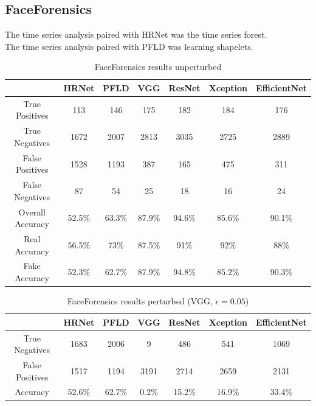 \subsection{FaceForensics}

The time series analysis paired with HRNet was the time series forest.\\
The time series analysis paired with PFLD was learning shapelets.

\begin{table}[H]
    \centering
    \begin{tabular}{|c|c|c|c|c|c|c|}
        \hline
        \textbf{} & \textbf{HRNet} & \textbf{PFLD} &  \textbf{VGG} & \textbf{ResNet} & \textbf{Xception} & \textbf{EfficientNet} \\
        \hline
        True Positives & 113 & 146 & 175 & 182 & 184 & 176\\
        \hline
        True Negatives & 1672 & 2007 & 2813 & 3035 & 2725 & 2889\\
        \hline
        False Positives & 1528 & 1193 & 387 & 165 & 475 & 311\\
        \hline
        False Negatives & 87 & 54 & 25 & 18 & 16 & 24\\
        \hline
        Overall Accuracy & 52.5\% & 63.3\% & 87.9\% & 94.6\% & 85.6\% & 90.1\% \\
        \hline
        Real Accuracy & 56.5\% & 73\% & 87.5\% & 91\% & 92\% & 88\% \\
        \hline
        Fake Accuracy & 52.3\% & 62.7\% & 87.9\% & 94.8\% & 85.2\% & 90.3\% \\
        \hline
    \end{tabular}
    \caption{FaceForensics results unperturbed}
    \label{tab:ff-un}
\end{table}

\begin{table}[H]
    \centering
    \begin{tabular}{|c|c|c|c|c|c|c|}
        \hline
        \textbf{} & \textbf{HRNet} & \textbf{PFLD} &  \textbf{VGG} & \textbf{ResNet} & \textbf{Xception} & \textbf{EfficientNet} \\
        \hline
        True Negatives & 1683 & 2006 & 9 & 486 & 541 & 1069\\
        \hline
        False Positives & 1517 & 1194 & 3191 & 2714 & 2659 & 2131\\
        \hline
        Accuracy & 52.6\% & 62.7\% & 0.2\% & 15.2\% & 16.9\% & 33.4\% \\
        \hline
    \end{tabular}
    \caption{FaceForensics results perturbed (VGG, $\epsilon=0.05$)}
    \label{tab:ff-vgg-5}
\end{table}

